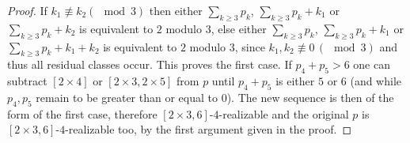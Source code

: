 \begin{theorem}
\begin{proof}
    If $k_1 \not\equiv k_2 (\mod 3)$ then either $\sum_{k\geq 3} p_k$, $\sum_{k\geq 3} p_k + k_1$ or $\sum_{k\geq 3} p_k + k_2$ is equivalent to $2$ modulo $3$, else either $\sum_{k\geq 3} p_k$, $\sum_{k\geq 3} p_k + k_1$ or $\sum_{k\geq 3} p_k + k_1 + k_2$ is equivalent to $2$ modulo $3$, since $k_1, k_2 \not\equiv 0\,(\mod 3)$ and thus all residual classes occur. This proves the first case. If $p_4 + p_5 > 6$ one can subtract $[2 \times 4]$ or $[2 \times 3, 2 \times 5]$ from $p$ until $p_4 + p_5$ is either $5$ or $6$ (and while $p_4, p_5$ remain to be greater than or equal to $0$). The new sequence is then of the form of the first case, therefore $[2 \times 3, 6]$-$4$-realizable and the original $p$ is $[2 \times 3, 6]$-$4$-realizable too, by the first argument given in the proof.
  \end{proof}
\end{theorem}
